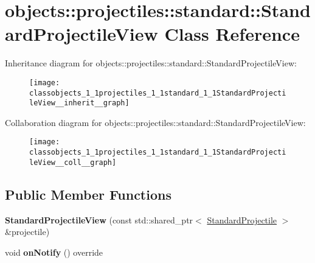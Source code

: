 \hypertarget{classobjects_1_1projectiles_1_1standard_1_1StandardProjectileView}{}\section{objects\+:\+:projectiles\+:\+:standard\+:\+:Standard\+Projectile\+View Class Reference}
\label{classobjects_1_1projectiles_1_1standard_1_1StandardProjectileView}


Inheritance diagram for objects\+:\+:projectiles\+:\+:standard\+:\+:Standard\+Projectile\+View\+:\nopagebreak
\begin{figure}[H]
\begin{center}
\leavevmode
\texttt{[image: classobjects\_1\_1projectiles\_1\_1standard\_1\_1StandardProjectileView\_\_inherit\_\_graph]}
\end{center}
\end{figure}


Collaboration diagram for objects\+:\+:projectiles\+:\+:standard\+:\+:Standard\+Projectile\+View\+:\nopagebreak
\begin{figure}[H]
\begin{center}
\leavevmode
\texttt{[image: classobjects\_1\_1projectiles\_1\_1standard\_1\_1StandardProjectileView\_\_coll\_\_graph]}
\end{center}
\end{figure}
\subsection*{Public Member Functions}
\begin{DoxyCompactItemize}
\item 
\mbox{\label{classobjects_1_1projectiles_1_1standard_1_1StandardProjectileView_a93bc0e6f5a422406185e4d99b2e0f83e}}
{\bfseries Standard\+Projectile\+View} (const std\+::shared\+\_\+ptr$<$ \hyperlink{classobjects_1_1projectiles_1_1standard_1_1StandardProjectile}{Standard\+Projectile} $>$ \&projectile)
\item 
\mbox{\label{classobjects_1_1projectiles_1_1standard_1_1StandardProjectileView_a8afdc8dc0deace3a76b1b43ca0e1b251}}
void {\bfseries on\+Notify} () override
\end{DoxyCompactItemize}
